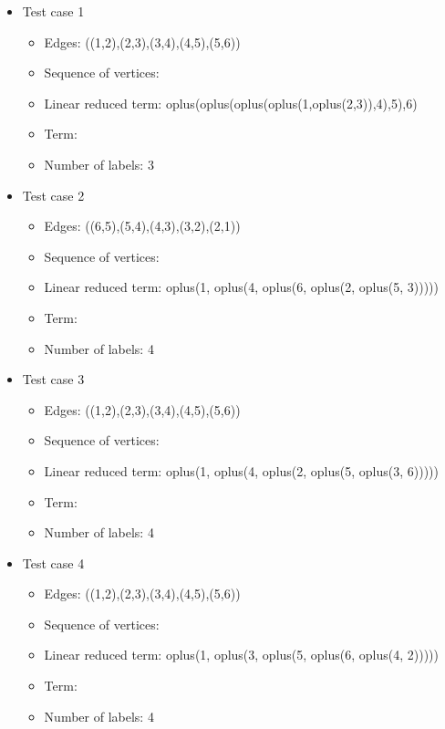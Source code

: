 \documentclass[a4paper, 12pt]{article}
\begin{document}
\begin{itemize}

\item Test case 1
	\begin{itemize}
		\item Edges: ((1,2),(2,3),(3,4),(4,5),(5,6))
		\item Sequence of vertices: 
		\item Linear reduced term: oplus(oplus(oplus(oplus(1,oplus(2,3)),4),5),6)
		\item Term: 
		\item Number of labels: 3
	\end{itemize}

\item Test case 2
	\begin{itemize}
		\item Edges: ((6,5),(5,4),(4,3),(3,2),(2,1))
		\item Sequence of vertices: 
		\item Linear reduced term: oplus(1, oplus(4, oplus(6, oplus(2, oplus(5, 3)))))
		\item Term: 
		\item Number of labels: 4
	\end{itemize}

\item Test case 3
	\begin{itemize}
		\item Edges: ((1,2),(2,3),(3,4),(4,5),(5,6))
		\item Sequence of vertices: 
		\item Linear reduced term: oplus(1, oplus(4, oplus(2, oplus(5, oplus(3, 6)))))
		\item Term: 
		\item Number of labels: 4
	\end{itemize}

\item Test case 4
	\begin{itemize}
		\item Edges: ((1,2),(2,3),(3,4),(4,5),(5,6))
		\item Sequence of vertices: 
		\item Linear reduced term: oplus(1, oplus(3, oplus(5, oplus(6, oplus(4, 2)))))
		\item Term: 
		\item Number of labels: 4
	\end{itemize}


\end{itemize}
\end{document}
